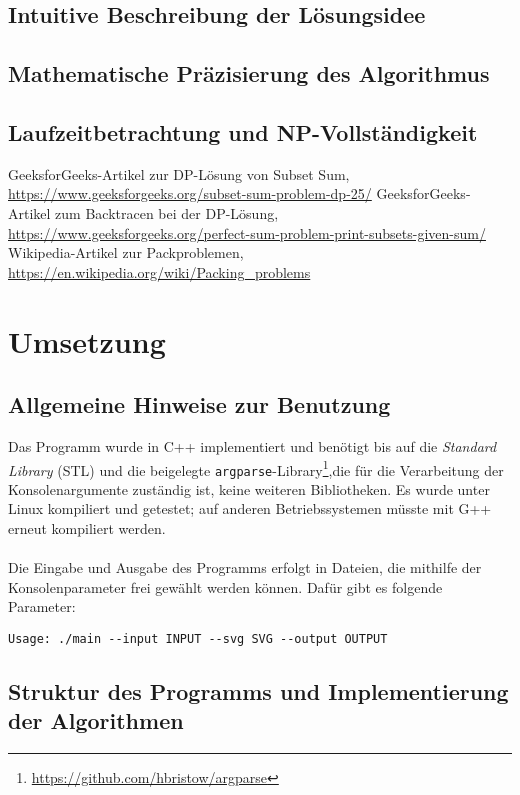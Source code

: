 \documentclass[a4paper, notitlepage, 12pt]{scrartcl}
\begin{document}
  \subsection{Intuitive Beschreibung der Lösungsidee}
 \subsection{Mathematische Präzisierung des Algorithmus}
 \subsection{Laufzeitbetrachtung und NP-Vollständigkeit}
\begin{thebibliography}{xx}
	 GeeksforGeeks-Artikel zur DP-Lösung von Subset Sum, \url{https://www.geeksforgeeks.org/subset-sum-problem-dp-25/}
	 GeeksforGeeks-Artikel zum Backtracen bei der DP-Lösung, \url{https://www.geeksforgeeks.org/perfect-sum-problem-print-subsets-given-sum/}
	 Wikipedia-Artikel zur Packproblemen, \url{https://en.wikipedia.org/wiki/Packing_problems}
\end{thebibliography}
\section{Umsetzung}
\subsection{Allgemeine Hinweise zur Benutzung}
Das Programm wurde in C++ implementiert und benötigt bis auf die \textit{Standard Library} (STL) und die beigelegte \texttt{argparse}-Library\footnote{\url{https://github.com/hbristow/argparse}},die für die Verarbeitung der Konsolenargumente zuständig ist, keine weiteren Bibliotheken. Es wurde unter Linux kompiliert und getestet; auf anderen Betriebssystemen müsste mit G++ erneut kompiliert werden. \\ \\
Die Eingabe und Ausgabe des Programms erfolgt in Dateien, die mithilfe der Konsolenparameter frei gewählt werden können. Dafür gibt es folgende Parameter:
\begin{verbatim}
Usage: ./main --input INPUT --svg SVG --output OUTPUT
\end{verbatim}
\subsection{Struktur des Programms und Implementierung der Algorithmen}
\end{document}
